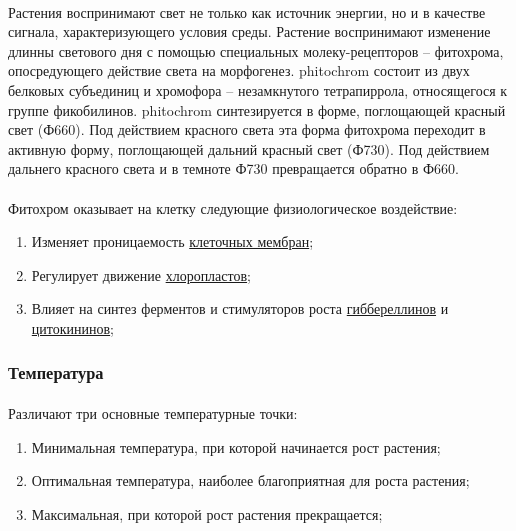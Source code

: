 \paragraph*{}Растения воспринимают свет не только как источник энергии, но и в качестве сигнала, характеризующего условия среды. Растение воспринимают изменение длинны светового дня с помощью специальных молеку-рецепторов -- \hypertarget{phitochrom}{фитохрома}, опосредующего действие света на морфогенез. \gls{phitochrom} состоит из двух белковых субъединиц и хромофора – незамкнутого тетрапиррола, относящегося к группе фикобилинов. \gls{phitochrom} синтезируется в форме, поглощающей красный свет (Ф660). Под действием красного света эта форма фитохрома переходит в активную форму, поглощающей дальний красный свет (Ф730). Под действием дальнего красного света и в темноте Ф730 превращается обратно в Ф660. 
\paragraph*{}Фитохром оказывает на клетку следующие физиологическое воздействие: 

\begin{enumerate}
	\item Изменяет проницаемость \hyperlink{plasmolema}{клеточных мембран};
	\item Регулирует движение \hyperlink{cell_plastids}{хлоропластов};
	\item Влияет на синтез ферментов и стимуляторов роста \hyperlink{gybberelin}{гиббереллинов} и \hyperlink{citokin}{цитокининов};
\end{enumerate}

\subsubsection*{Температура}

\paragraph*{}Различают три основные температурные точки: 

\begin{enumerate}
	\item Минимальная температура, при которой начинается рост растения;
	\item Оптимальная температура, наиболее благоприятная для роста растения;
	\item Максимальная, при которой рост растения прекращается;
\end{enumerate}

